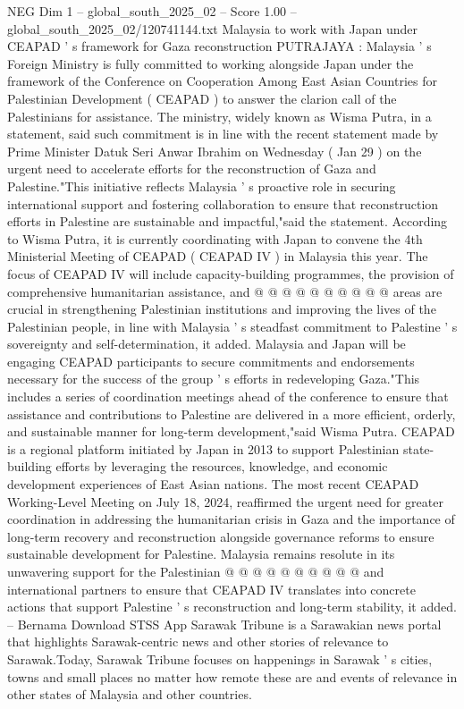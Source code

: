 \begin{textsample}{NEG Dim 1 – global\_south\_2025\_02 – Score 1.00 – global\_south\_2025\_02/120741144.txt}  \label{ex:f1_neg_088}
Malaysia to work with Japan under CEAPAD ' s framework for Gaza reconstruction PUTRAJAYA : Malaysia ' s Foreign Ministry is fully committed to working alongside Japan under the framework of the Conference on Cooperation Among East Asian Countries for Palestinian Development ( CEAPAD ) to answer the clarion call of the Palestinians for assistance.
The ministry, widely known as Wisma Putra, in a statement, said such commitment is in line with the recent statement made by Prime Minister Datuk Seri Anwar Ibrahim on Wednesday ( Jan 29 ) on the urgent need to accelerate efforts for the reconstruction of Gaza and Palestine."This initiative reflects Malaysia ' s proactive role in securing international support and fostering collaboration to ensure that reconstruction efforts in Palestine are sustainable and impactful,"said the statement.
According to Wisma Putra, it is currently coordinating with Japan to convene the 4th Ministerial Meeting of CEAPAD ( CEAPAD IV ) in Malaysia this year.
The focus of CEAPAD IV will include capacity-building programmes, the provision of comprehensive humanitarian assistance, and @ @ @ @ @ @ @ @ @ @ areas are crucial in strengthening Palestinian institutions and improving the lives of the Palestinian people, in line with Malaysia ' s steadfast commitment to Palestine ' s sovereignty and self-determination, it added.
Malaysia and Japan will be engaging CEAPAD participants to secure commitments and endorsements necessary for the success of the group ' s efforts in redeveloping Gaza."This includes a series of coordination meetings ahead of the conference to ensure that assistance and contributions to Palestine are delivered in a more efficient, orderly, and sustainable manner for long-term development,"said Wisma Putra.
CEAPAD is a regional platform initiated by Japan in 2013 to support Palestinian state-building efforts by leveraging the resources, knowledge, and economic development experiences of East Asian nations.
The most recent CEAPAD Working-Level Meeting on July 18, 2024, reaffirmed the urgent need for greater coordination in addressing the humanitarian crisis in Gaza and the importance of long-term recovery and reconstruction alongside governance reforms to ensure sustainable development for Palestine.
Malaysia remains resolute in its unwavering support for the Palestinian @ @ @ @ @ @ @ @ @ @ and international partners to ensure that CEAPAD IV translates into concrete actions that support Palestine ' s reconstruction and long-term stability, it added. -- Bernama Download STSS App Sarawak Tribune is a Sarawakian news portal that highlights Sarawak-centric news and other stories of relevance to Sarawak.Today, Sarawak Tribune focuses on happenings in Sarawak ' s cities, towns and small places no matter how remote these are and events of relevance in other states of Malaysia and other countries.

\end{textsample}

